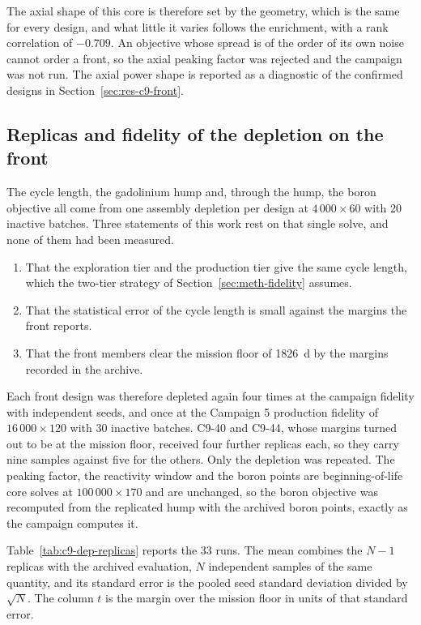 The axial shape of this core is therefore set by the geometry, which is
the same for every design, and what little it varies follows the
enrichment, with a rank correlation of $-0.709$. An objective whose
spread is of the order of its own noise cannot order a front, so the
axial peaking factor was rejected and the campaign was not run. The
axial power shape is reported as a diagnostic of the confirmed designs
in Section~\ref{sec:res-c9-front}.

\subsection{Replicas and fidelity of the depletion on the front}
\label{sec:res-c9-dep-check}

The cycle length, the gadolinium hump and, through the hump, the boron
objective all come from one assembly depletion per design at
$4\,000\times60$ with 20 inactive batches. Three statements of this work
rest on that single solve, and none of them had been measured.

\begin{enumerate}
  \item That the exploration tier and the production tier give the same
        cycle length, which the two-tier strategy of
        Section~\ref{sec:meth-fidelity} assumes.

  \item That the statistical error of the cycle length is small against
        the margins the front reports.

  \item That the front members clear the mission floor of \SI{1826}{d}
        by the margins recorded in the archive.
\end{enumerate}

Each front design was therefore depleted again four times at the campaign
fidelity with independent seeds, and once at the Campaign 5 production
fidelity of $16\,000\times120$ with 30 inactive batches. C9-40 and C9-44,
whose margins turned out to be at the mission floor, received four
further replicas each, so they carry nine samples against five for the
others. Only the depletion was repeated. The peaking factor, the
reactivity window and the boron points are beginning-of-life core solves
at $100\,000\times170$ and are unchanged, so the boron objective was
recomputed from the replicated hump with the archived boron points,
exactly as the campaign computes it.

Table~\ref{tab:c9-dep-replicas} reports the 33 runs. The mean combines
the $N-1$ replicas with the archived evaluation, $N$ independent samples
of the same quantity, and its standard error is the pooled seed standard
deviation divided by $\sqrt{N}$. The column $t$ is the margin over the
mission floor in units of that standard error.

